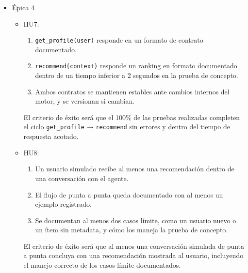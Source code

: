 \documentclass[
11pt, %
]{charter}
\begin{document}
\begin{itemize}
\begin{itemize}
\begin{enumerate}[label=(\alph*)]
          \item Se declara explícitamente el dataset acotado utilizado para el ajuste.
          \item Se compara al menos una métrica de calidad entre el modelo dedicado y una alternativa entrenada desde cero.
          \item El proceso de ajuste es reproducible sobre el mismo dataset acotado.
        \end{enumerate}
        El criterio de éxito será que el modelo dedicado iguale o supere la métrica de calidad del modelo entrenado desde cero, usando el mismo dataset acotado, lo que validaría la ganancia del transfer learning.
    \end{itemize}
  \item \'{E}pica 4
    \begin{itemize}
      \item HU7:
        \begin{enumerate}[label=(\alph*)]
          \item \texttt{get\_profile(user)} responde en un formato de contrato documentado.
          \item \texttt{recommend(context)} responde un ranking en formato documentado dentro de un tiempo inferior a 2 segundos en la prueba de concepto.
          \item Ambos contratos se mantienen estables ante cambios internos del motor, y se versionan si cambian.
        \end{enumerate}
        El criterio de éxito será que el 100\% de las pruebas realizadas completen el ciclo \texttt{get\_profile} → \texttt{recommend} sin errores y dentro del tiempo de respuesta acotado.
      \item HU8:
        \begin{enumerate}[label=(\alph*)]
          \item Un usuario simulado recibe al menos una recomendación dentro de una conversación con el agente.
          \item El flujo de punta a punta queda documentado con al menos un ejemplo registrado.
          \item Se documentan al menos dos casos límite, como un usuario nuevo o un ítem sin metadata, y cómo los maneja la prueba de concepto.
        \end{enumerate}
        El criterio de éxito será que al menos una conversación simulada de punta a punta concluya con una recomendación mostrada al usuario, incluyendo el manejo correcto de los casos límite documentados.
    \end{itemize}
\end{itemize}
\end{document}

